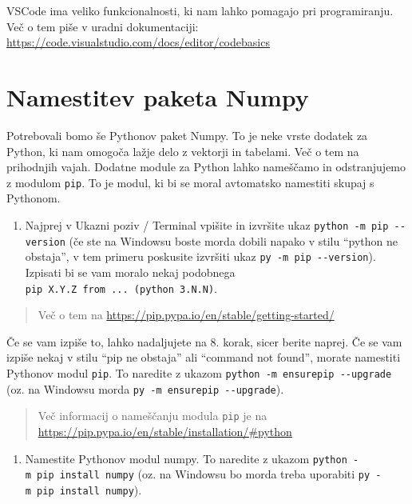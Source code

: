 \documentclass[
]{report}
\providecommand{\tightlist}{%
  \setlength{\itemsep}{0pt}\setlength{\parskip}{0pt}}
\begin{document}
VSCode ima veliko funkcionalnosti, ki nam lahko pomagajo pri programiranju.
Več o tem piše v uradni dokumentaciji: \url{https://code.visualstudio.com/docs/editor/codebasics}

\hypertarget{namestitev-paketa-numpy}{%
\section{Namestitev paketa Numpy}\label{namestitev-paketa-numpy}}

Potrebovali bomo še Pythonov paket Numpy. To je neke vrste dodatek za Python, ki nam omogoča lažje delo z vektorji in tabelami. Več o tem na prihodnjih vajah. Dodatne module za Python lahko nameščamo in odstranjujemo z modulom \texttt{pip}. To je modul, ki bi se moral avtomatsko namestiti skupaj s Pythonom.

\begin{enumerate}
\def\labelenumi{\arabic{enumi}.}
\setcounter{enumi}{6}
\tightlist
\item
  Najprej v Ukazni poziv / Terminal vpišite in izvršite ukaz \texttt{python\ -m\ pip\ -\/-version}
  (če ste na Windowsu boste morda dobili napako v stilu ``python ne obstaja'',
  v tem primeru poskusite izvršiti ukaz \texttt{py\ -m\ pip\ -\/-version}).
  Izpisati bi se vam moralo nekaj podobnega \texttt{pip\ X.Y.Z\ from\ ...\ (python\ 3.N.N)}.
\end{enumerate}

\begin{quote}
Več o tem na \url{https://pip.pypa.io/en/stable/getting-started/}
\end{quote}

Če se vam izpiše to, lahko nadaljujete na 8. korak, sicer berite naprej.
Če se vam izpiše nekaj v stilu ``pip ne obstaja'' ali ``command not found'',
morate namestiti Pythonov modul \texttt{pip}. To naredite z ukazom
\texttt{python\ -m\ ensurepip\ -\/-upgrade} (oz. na Windowsu morda \texttt{py\ -m\ ensurepip\ -\/-upgrade}).

\begin{quote}
Več informacij o nameščanju modula \texttt{pip} je na \url{https://pip.pypa.io/en/stable/installation/\#python}
\end{quote}

\begin{enumerate}
\def\labelenumi{\arabic{enumi}.}
\setcounter{enumi}{7}
\tightlist
\item
  Namestite Pythonov modul numpy. To naredite z ukazom \texttt{python\ -m\ pip\ install\ numpy}
  (oz. na Windowsu bo morda treba uporabiti \texttt{py\ -m\ pip\ install\ numpy}).
\end{enumerate}
\end{document}
